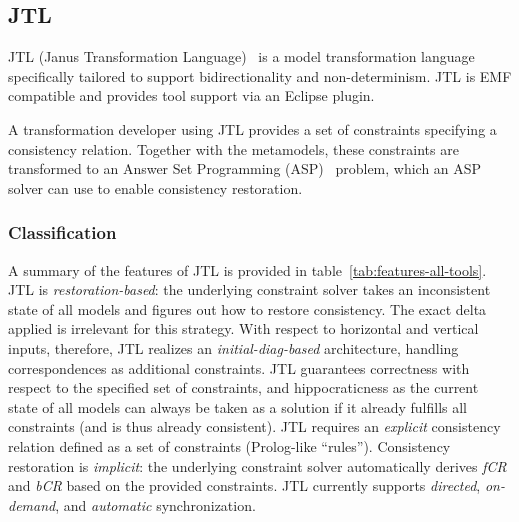 \subsection{JTL}
\label{sec:JTL}

JTL (Janus Transformation Language)~\cite{CDEP10,ErPT18} is a model transformation language specifically tailored to support bidirectionality and non-determinism.
JTL is EMF compatible and provides tool support via an Eclipse plugin.

A transformation developer using JTL provides a set of constraints specifying a consistency relation.
Together with the metamodels, these constraints are transformed to an Answer Set Programming (ASP)~\cite{GL88} problem, which an ASP solver can use to enable consistency restoration.


\subsubsection{Classification}
A summary of the features of JTL is provided in table~\ref{tab:features-all-tools}.
JTL is \emph{restoration-based}: the underlying constraint solver takes an inconsistent state of all models and figures out how to restore consistency.
The exact delta applied is irrelevant for this strategy.
%
With respect to horizontal and vertical inputs, therefore, JTL realizes an \emph{initial-diag-based} architecture, handling correspondences as additional constraints. 
%
JTL guarantees correctness with respect to the specified set of constraints, and hippocraticness as the current state of all models can always be taken as a solution if it already fulfills all constraints (and is thus already consistent).
%
JTL requires an \emph{explicit} consistency relation defined as a set of constraints (Prolog-like ``rules'').
%
Consistency restoration is \emph{implicit}:  the underlying constraint solver automatically derives \emph{fCR} and \emph{bCR} based on the provided constraints.
%
JTL currently supports \emph{directed}, \emph{on-demand}, and \emph{automatic} synchronization.

